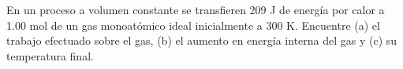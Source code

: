 \item En un proceso a volumen constante se transfieren 209 J de energía por calor a 1.00 mol de un gas monoatómico ideal inicialmente a 300 K. Encuentre (a) el trabajo efectuado sobre el gas, (b) el aumento en energía interna del gas y (c) su temperatura final.

